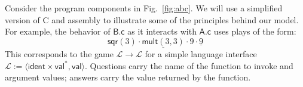 \documentclass[acmsmall,authordraft]{acmart}
\newcommand{\kw}[1]{\ensuremath{ \mathsf{#1} }}
\begin{document}
\begin{example} \label{ex:abc} %
Consider the program components in Fig.~\ref{fig:abc}.
We will use a simplified version of C and assembly
to illustrate some of the principles behind our model.
For example, the behavior of $\textsf{B.c}$
as it interacts with $\textsf{A.c}$
uses plays of the form:
\begin{equation} \label{eqn:cplay}
  \mathsf{sqr}(3) \cdot
    \underline{\mathsf{mult}(3,3)} \cdot 9 \cdot \underline{9}
\end{equation}
This corresponds to the game $\mathcal{L} \rightarrow \mathcal{L}$
for a simple language interface
$\mathcal{L} := \langle \kw{ident} \times \kw{val}^*, \kw{val} \rangle$.
Questions carry the name of the function to invoke
and argument values;
answers carry the value returned by the function.


\end{example}
\end{document}
